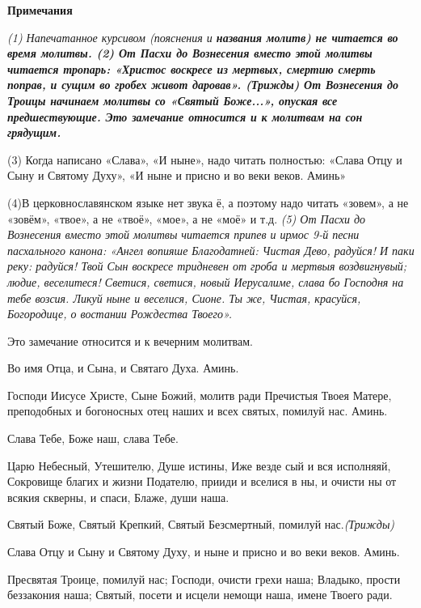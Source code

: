 \medskip


\bfseries Примечания\normalfont{}\nopagebreak


\itshape (1)\normalfont{} Напечатанное курсивом (\itshape пояснения\normalfont{} и \bfseries названия молитв\normalfont{}) не читается во время молитвы.
  \itshape (2)\normalfont{} От Пасхи до Вознесения вместо этой молитвы читается тропарь: «Христос воскресе из мертвых, смертию смерть поправ, и сущим во гробех живот даровав». (Трижды) От Вознесения до Троицы начинаем молитвы со «Святый Боже...», опуская все предшествующие. 
Это замечание относится и к молитвам на сон грядущим.\itshape 


(3)\normalfont{} Когда написано «Слава», «И ныне», надо читать полностью: «Слава Отцу и Сыну и Святому Духу», «И ныне и присно и во веки веков. Аминь»\itshape 


(4)\normalfont{}В церковнославянском языке нет звука ё, а поэтому надо читать «зовем», а не «зовём», «твое», а не «твоё», «мое», а не «моё» и т.д. \itshape 
(5)\normalfont{} От Пасхи до Вознесения вместо этой молитвы читается припев и ирмос 9-й песни пасхального канона: 
«Ангел вопияше Благодатней: Чистая Дево, радуйся! И паки реку: радуйся! Твой Сын воскресе тридневен от гроба и мертвыя воздвигнувый; людие, веселитеся! 
Светися, светися, новый Иерусалиме, слава бо Господня на тебе возсия. Ликуй ныне и веселися, Сионе. Ты же, Чистая, красуйся, Богородице, о востании Рождества Твоего».


Это замечание относится и к вечерним молитвам. \mychapterending

 
Во имя Отца, и Сына, и Святаго Духа. Аминь.


Господи Иисусе Христе, Сыне Божий, молитв ради Пречистыя Твоея Матере, преподобных и богоносных отец наших и всех святых, помилуй нас. Аминь.


Слава Тебе, Боже наш, слава Тебе.


Царю Небесный, Утешителю, Душе истины, Иже везде сый и вся исполняяй, Сокровище благих и жизни Подателю, прииди и вселися в ны, и очисти ны от всякия скверны, и спаси, Блаже, души наша.


Святый Боже, Святый Крепкий, Святый Безсмертный, помилуй нас.\itshape  (Трижды)\normalfont{}


Слава Отцу и Сыну и Святому Духу, и ныне и присно и во веки веков. Аминь.


Пресвятая Троице, помилуй нас; Господи, очисти грехи наша; Владыко, прости беззакония наша; Святый, посети и исцели немощи наша, имене Твоего ради.


